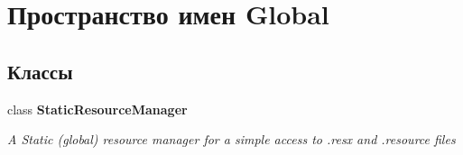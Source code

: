 \hypertarget{namespace_global}{}\section{Пространство имен Global}
\label{namespace_global}
\subsection*{Классы}
\begin{DoxyCompactItemize}
\item 
class {\bfseries Static\+Resource\+Manager}
\begin{DoxyCompactList}\small\item\em A Static (global) resource manager for a simple access to .resx and .resource files \end{DoxyCompactList}\end{DoxyCompactItemize}
